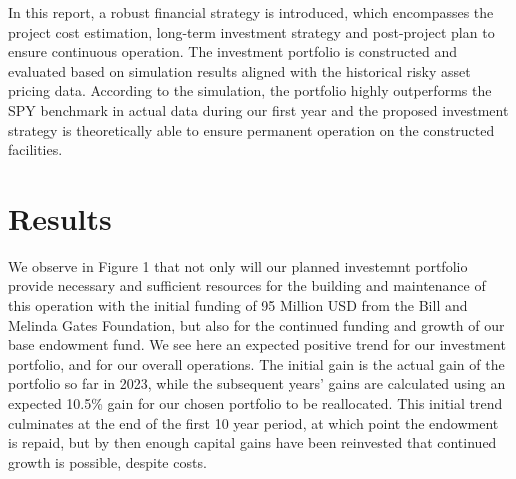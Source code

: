 \documentclass[10pt,twocolumn,twoside,final]{IEEEtran}
\begin{document}
In this report, a robust financial strategy is introduced, which encompasses the project cost estimation, long-term investment strategy and post-project plan to ensure continuous operation. The investment portfolio is constructed and evaluated based on simulation results aligned with the historical risky asset pricing data. According to the simulation, the portfolio highly outperforms the SPY benchmark in actual data during our first year and the proposed investment strategy is theoretically able to ensure permanent operation on the constructed facilities.


\section{Results}

We observe in Figure 1 that not only will our planned investemnt portfolio provide necessary and sufficient resources for the building and maintenance of this operation with the initial funding of 95 Million USD from the Bill and Melinda Gates Foundation, but also for the continued funding and growth of our base endowment fund. We see here an expected positive trend for our investment portfolio, and for our overall operations. The initial gain is the actual gain of the portfolio so far in 2023, while the subsequent years' gains are calculated using an expected 10.5\% gain for our chosen portfolio to be reallocated. This initial trend culminates at the end of the first 10 year period, at which point the endowment is repaid, but by then enough capital gains have been reinvested that continued growth is possible, despite costs.
\end{document}
